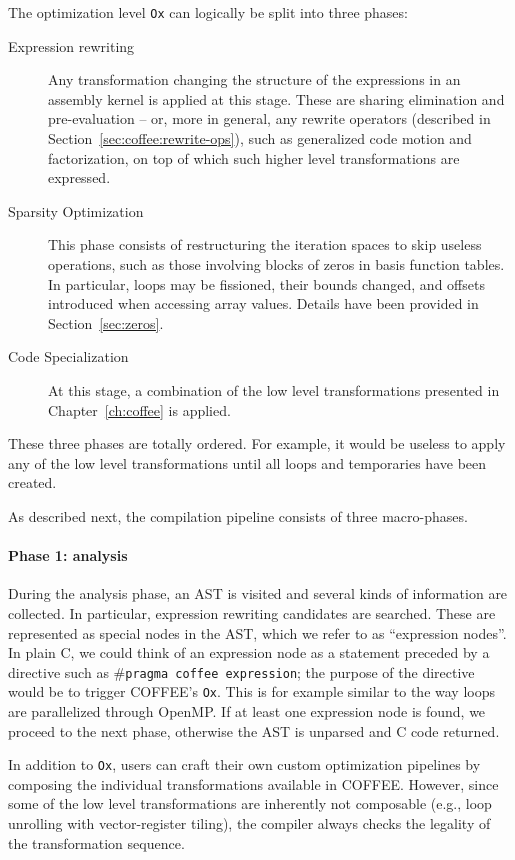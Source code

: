 The optimization level \texttt{Ox} can logically be split into three phases:
\begin{description}
\item[Expression rewriting] Any transformation changing the structure of the expressions in an assembly kernel is applied at this stage. These are sharing elimination and pre-evaluation -- or, more in general, any rewrite operators (described in Section~\ref{sec:coffee:rewrite-ops}), such as generalized code motion and factorization, on top of which such higher level transformations are expressed. 
\item[Sparsity Optimization] This phase consists of restructuring the iteration spaces to skip useless operations, such as those involving blocks of zeros in basis function tables. In particular, loops may be fissioned, their bounds changed, and offsets introduced when accessing array values. Details have been provided in Section~\ref{sec:zeros}.
\item[Code Specialization] At this stage, a combination of the low level transformations presented in Chapter~\ref{ch:coffee} is applied.
\end{description}
These three phases are totally ordered. For example, it would be useless to apply any of the low level transformations until all loops and temporaries have been created.

As described next, the compilation pipeline consists of three macro-phases.

\paragraph{Phase 1: analysis}
During the analysis phase, an AST is visited and several kinds of information are collected. In particular, expression rewriting candidates are searched. These are represented as special nodes in the AST, which we refer to as ``expression nodes''. In plain C, we could think of an expression node as a statement preceded by a directive such as \texttt{$\#$pragma coffee expression}; the purpose of the directive would be to trigger COFFEE's \texttt{Ox}. This is for example similar to the way loops are parallelized through OpenMP. If at least one expression node is found, we proceed to the next phase, otherwise the AST is unparsed and C code returned.

In addition to \texttt{Ox}, users can craft their own custom optimization pipelines by composing the individual transformations available in COFFEE. However, since some of the low level transformations are inherently not composable (e.g., loop unrolling with vector-register tiling), the compiler always checks the legality of the transformation sequence. 

